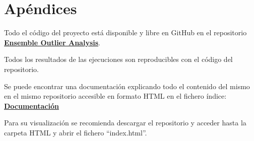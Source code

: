 \chapter{Apéndices}

Todo el código del proyecto está disponible y libre en GitHub en el repositorio \href{https://github.com/nacheteam/Ensemble-Outlier-Analysis}{\textbf{Ensemble Outlier Analysis}}.

Todos los resultados de las ejecuciones son reproducibles con el código del repositorio.

Se puede encontrar una documentación explicando todo el contenido del mismo en el mismo repositorio accesible en formato HTML en el fichero índice: \href{https://github.com/nacheteam/Ensemble-Outlier-Analysis/tree/master/doc_build/html}{\textbf{Documentación}}

Para su visualización se recomienda descargar el repositorio y acceder hasta la carpeta HTML y abrir el fichero ``index.html''.